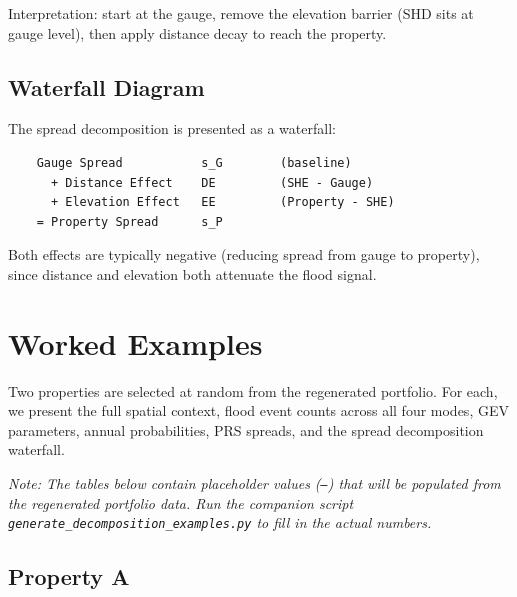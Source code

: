 \documentclass[11pt,a4paper]{article}
\begin{document}
\noindent Interpretation: start at the gauge, remove the elevation barrier (SHD sits at
gauge level), then apply distance decay to reach the property.

\subsection{Waterfall Diagram}

The spread decomposition is presented as a waterfall:

\begin{verbatim}
    Gauge Spread           s_G        (baseline)
      + Distance Effect    DE         (SHE - Gauge)
      + Elevation Effect   EE         (Property - SHE)
    = Property Spread      s_P
\end{verbatim}

\noindent Both effects are typically negative (reducing spread from gauge to property),
since distance and elevation both attenuate the flood signal.


\section{Worked Examples}

Two properties are selected at random from the regenerated portfolio.  For each, we
present the full spatial context, flood event counts across all four modes, GEV
parameters, annual probabilities, PRS spreads, and the spread decomposition waterfall.

\medskip
\noindent\textit{Note: The tables below contain placeholder values (\texttt{---}) that
will be populated from the regenerated portfolio data. Run the companion script
\texttt{generate\_decomposition\_examples.py} to fill in the actual numbers.}

\subsection{Property A}
\end{document}
